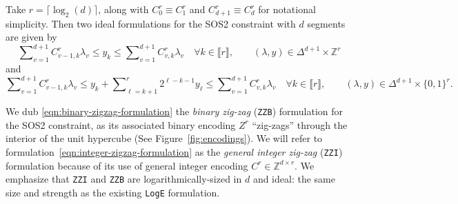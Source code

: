 \documentclass[opre,nonblindrev]{informs3} %
\newcommand{\bbZ}{\mathbb{Z}}
\newcommand{\ZZB}{\texttt{ZZB}}
\newcommand{\ZZI}{\texttt{ZZI}}
\newcommand{\Log}{\texttt{LogE}}
\begin{document}
\begin{proposition} \label{prop:new-sos2}
Take $r = \lceil \log_2(d) \rceil$, along with $C^r_0 \equiv C^r_1$ and $C^r_{d+1} \equiv C^r_d$ for notational simplicity. Then two ideal formulations for the SOS2 constraint with $d$ segments are given by
  \begin{equation} \label{eqn:integer-zigzag-formulation}
     \sum\nolimits_{v=1}^{d+1} C^r_{v-1,k}\lambda_v \leq y_k \leq \sum\nolimits_{v=1}^{d+1} C^r_{v,k}\lambda_v \quad \forall k \in \llbracket r \rrbracket,\quad\quad (\lambda,y) \in \Delta^{d+1} \times \bbZ^r
    \end{equation}
    and
        \begin{equation} \label{eqn:binary-zigzag-formulation}
     \sum\nolimits_{v=1}^{d+1} C^r_{v-1,k}\lambda_v \leq y_k + \sum\nolimits_{\ell=k+1}^r 2^{\ell-k-1} y_{\ell} \leq
        \sum\nolimits_{v=1}^{d+1} C^r_{v,k}\lambda_v \quad \forall k \in \llbracket r \rrbracket,\quad\quad (\lambda,y) \in \Delta^{d+1} \times \{0,1\}^r.
    \end{equation}
\end{proposition}

We dub \eqref{eqn:binary-zigzag-formulation} the \emph{binary zig-zag} (\ZZB{}) formulation for the SOS2 constraint, as its associated binary encoding $Z^r$ ``zig-zags'' through the interior of the unit hypercube (See Figure~\ref{fig:encodings}). We will refer to formulation~\eqref{eqn:integer-zigzag-formulation} as the \emph{general integer zig-zag} (\ZZI{}) formulation because of its use of general integer encoding $C^r \in \bbZ^{d \times r}$. We emphasize that \ZZI{} and \ZZB{} are logarithmically-sized in $d$ and ideal: the same size and strength as the existing \Log{} formulation.
\end{document}

